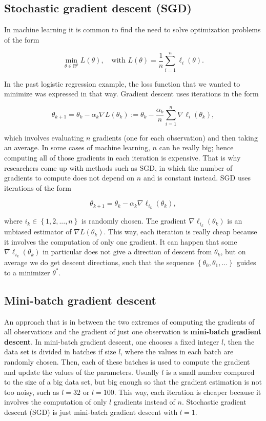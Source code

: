 \subsection{Stochastic gradient descent (SGD)}

In machine learning it is common to find the need to solve optimization problems of the form

\begin{equation}
  \min_{\theta \in \mathbb{R}^p} L(\theta), \quad \text{with} \, \,
  L(\theta) = \frac{1}{n} \sum_{i = 1}^n { \ell_i(\theta) }.
\end{equation}

In the past logistic regression example, the loss function that we wanted to minimize was expressed in that way. Gradient descent uses iterations in the form

\[
  \theta_{k+1} = \theta_k - \alpha_k \nabla L(\theta_k) :=\theta_k - \frac{\alpha_k}{n} \sum_{i = 1}^n \nabla \ell_i(\theta_k),
\]

which involves evaluating $n$ gradients (one for each observation) and then taking an average. In some cases of machine learning, $n$ can be really big; hence computing all of those gradients in each iteration is expensive. That is why researchers come up with methods such as SGD, in which the number of gradients to compute does not depend on $n$ and is constant instead. SGD uses iterations of the form

\[
  \theta_{k+1} = \theta_k - \alpha_k \nabla \ell_{i_k}(\theta_k),
\]

where $i_k \in \left\{1, 2, ..., n \right\}$ is randomly chosen. The gradient $\nabla \ell_{i_k}(\theta_k)$ is an unbiased estimator of $\nabla L(\theta_k)$. This way, each iteration is really cheap because it involves the computation of only one gradient. It can happen that some $\nabla \ell_{i_k}(\theta_k)$ in particular does not give a direction of descent from $\theta_k$, but on average we do get descent directions, such that the sequence $\left\{ \theta_0, \theta_1, ... \right\}$ guides to a minimizer $\theta^*$.

\subsection{Mini-batch gradient descent}

An approach that is in between the two extremes of computing the gradients of all observations and the gradient of just one observation is \textbf{mini-batch gradient descent}. In mini-batch gradient descent, one chooses a fixed integer $l$, then the data set is divided in batches if size $l$, where the values in each batch are randomly chosen. Then, each of these batches is used to compute the gradient and update the values of the parameters. Usually $l$ is a small number compared to the size of a big data set, but big enough so that the gradient estimation is not too noisy, such as $l = 32$ or $l = 100$. This way, each iteration is cheaper because it involves the computation of only $l$ gradients instead of $n$. Stochastic gradient descent (SGD) is just mini-batch gradient descent with $l = 1$.


